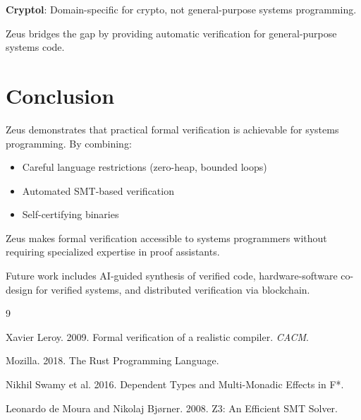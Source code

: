 \documentclass[sigplan,screen]{acmart}
\begin{document}
\textbf{Cryptol}: Domain-specific for crypto, not general-purpose systems programming.

Zeus bridges the gap by providing automatic verification for general-purpose systems code.

\section{Conclusion}

Zeus demonstrates that practical formal verification is achievable for systems programming. By combining:
\begin{itemize}
\item Careful language restrictions (zero-heap, bounded loops)
\item Automated SMT-based verification
\item Self-certifying binaries
\end{itemize}

Zeus makes formal verification accessible to systems programmers without requiring specialized expertise in proof assistants.

Future work includes AI-guided synthesis of verified code, hardware-software co-design for verified systems, and distributed verification via blockchain.


\begin{thebibliography}{9}

 Xavier Leroy. 2009. Formal verification of a realistic compiler. \textit{CACM}.

 Mozilla. 2018. The Rust Programming Language.

 Nikhil Swamy et al. 2016. Dependent Types and Multi-Monadic Effects in F*.

 Leonardo de Moura and Nikolaj Bjørner. 2008. Z3: An Efficient SMT Solver.

\end{thebibliography}
\end{document}
